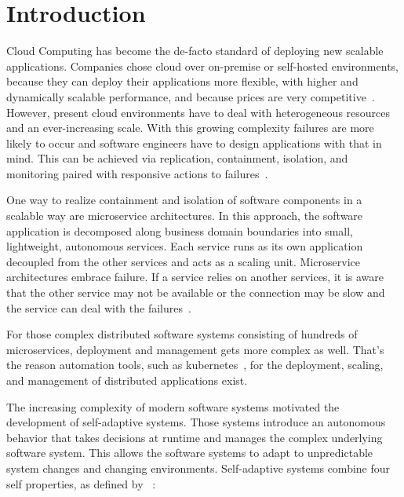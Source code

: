 
\section{Introduction}\label{sec:introduction}

  Cloud Computing has become the de-facto standard of deploying new scalable applications.
  Companies chose cloud over on-premise or self-hosted environments, because they can deploy their applications more flexible, with higher and dynamically scalable performance, and because prices are very competitive~\cite{ToffettiMicroservices}.
  However, present cloud environments have to deal with heterogeneous resources and an ever-increasing scale.
  With this growing complexity failures are more likely to occur and software engineers have to design applications with that in mind.
  This can be achieved via replication, containment, isolation, and monitoring paired with responsive actions to failures~\cite{reactivemanifesto}.

  One way to realize containment and isolation of software components in a scalable way are microservice architectures.
  In this approach, the software application is decomposed along business domain boundaries into small, lightweight, autonomous services.
  Each service runs as its own application decoupled from the other services and acts as a scaling unit.
  Microservice architectures embrace failure.
  If a service relies on another services, it is aware that the other service may not be available or the connection may be slow and the service can deal with the failures~\cite{microservices}.

  For those complex distributed software systems consisting of hundreds of microservices, deployment and management gets more complex as well.
  That's the reason automation tools, such as \gls{kubernetes}~\cite{kubernetes}, for the deployment, scaling, and management of distributed applications exist.

  The increasing complexity of modern software systems motivated the development of self-adaptive systems.
  Those systems introduce an autonomous behavior that takes decisions at runtime and manages the complex underlying software system.
  This allows the software systems to adapt to unpredictable system changes and changing environments.
  Self-adaptive systems combine four self properties, as defined by \citeauthor{Ganek}~\cite{Ganek}:


